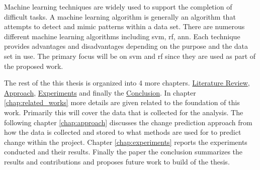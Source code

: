 
Machine learning techniques are widely used to support the completion of difficult tasks. A machine learning algorithm is generally an algorithm that attempts to detect and mimic patterns within a data set. There are numerous different machine learning algorithms including \gls{svm}, \gls{rf}, \gls{ann}. Each technique provides advantages and disadvantages depending on the purpose and the data set in use. The primary focus will be on \gls{svm} and \gls{rf} since they are used as part of the proposed work.




The rest of the this thesis is organized into 4 more chapters. \hyperref[chap:related_works]{Literature Review}, \hyperref[chap:approach]{Approach}, \hyperref[chap:experiments]{Experiments} and finally the \hyperref[chap:conclusions]{Conclusion}. In chapter \ref{chap:related_works} more details are given related to the foundation of this work. Primarily this will cover the data that is collected for the analysis. The following chapter \ref{chap:approach} discusses the change prediction approach from how the data is collected and stored to what methods are used for to predict change within the project. Chapter \ref{chap:experiments} reports the experiments conducted and their results. Finally the paper the conclusion summarizes the results and contributions and proposes future work to build of the thesis.